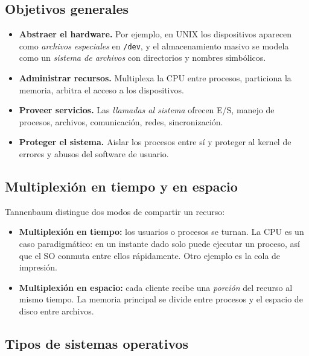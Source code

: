 \documentclass[11pt,a4paper]{article}
\begin{document}
\subsection{Objetivos generales}

\begin{itemize}[leftmargin=*]
    \item \textbf{Abstraer el hardware.} Por ejemplo, en UNIX los
        dispositivos aparecen como \emph{archivos especiales} en
        \texttt{/dev}, y el almacenamiento masivo se modela como un
        \emph{sistema de archivos} con directorios y nombres
        simbólicos.
    \item \textbf{Administrar recursos.} Multiplexa la CPU entre
        procesos, particiona la memoria, arbitra el acceso a los
        dispositivos.
    \item \textbf{Proveer servicios.} Las \emph{llamadas al sistema}
        ofrecen E/S, manejo de procesos, archivos, comunicación, redes,
        sincronización.
    \item \textbf{Proteger el sistema.} Aislar los procesos entre sí y
        proteger al kernel de errores y abusos del software de usuario.
\end{itemize}

\subsection{Multiplexión en tiempo y en espacio}

Tannenbaum distingue dos modos de compartir un recurso:

\begin{itemize}[leftmargin=*]
    \item \textbf{Multiplexión en tiempo:} los usuarios o procesos se
        turnan. La CPU es un caso paradigmático: en un instante dado
        solo puede ejecutar un proceso, así que el SO conmuta entre
        ellos rápidamente. Otro ejemplo es la cola de impresión.
    \item \textbf{Multiplexión en espacio:} cada cliente recibe una
        \emph{porción} del recurso al mismo tiempo. La memoria principal
        se divide entre procesos y el espacio de disco entre archivos.
\end{itemize}

\subsection{Tipos de sistemas operativos}
\end{document}

